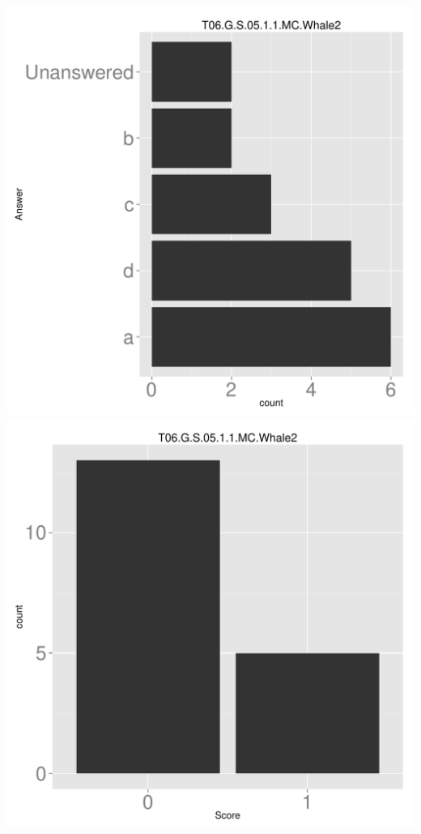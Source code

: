 \documentclass[12pt,nohyper]{tufte-handout}\usepackage[]{graphicx}\usepackage[]{color}
\begin{document}
\begin{center} \includegraphics[width=.45\linewidth]{Topic06_78_answer} \includegraphics[width=.45\linewidth]{Topic06_78_score} \end{center} 
\end{document}
